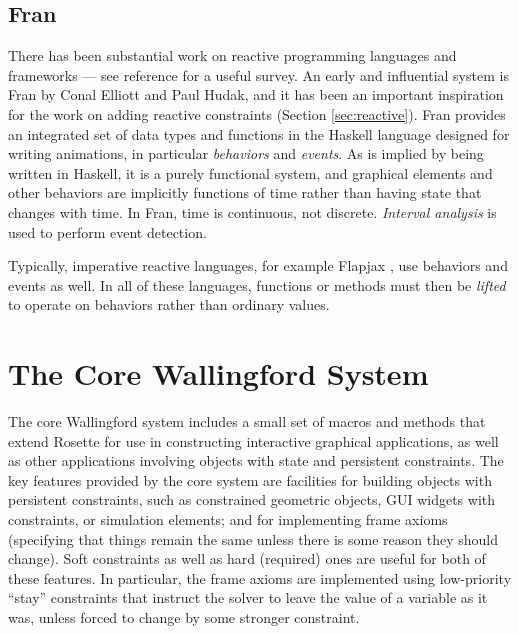 \documentclass{sigplanconf}
\begin{document}
\subsection{Fran}
\label{sec:fran}

There has been substantial work on reactive programming languages and
frameworks --- see reference
\cite{bainomugisha-computing-surveys-2012} for a useful survey.  An
early and influential system is Fran by Conal Elliott and Paul Hudak,
and it has been an important inspiration for the work on adding
reactive constraints (Section \ref{sec:reactive}).  Fran provides an
integrated set of data types and functions in the Haskell language
designed for writing animations, in particular \emph{behaviors} and
\emph{events}.  As is implied by being written in Haskell, it is a
purely functional system, and graphical elements and other behaviors
are implicitly functions of time rather than having state that changes
with time.  In Fran, time is continuous, not discrete.  \emph{Interval
  analysis} \cite{snyder-siggraph-1992} is used to perform event
detection.

Typically, imperative reactive languages, for example Flapjax
\cite{meyerovich-oopsla-2009}, use behaviors and events as well.  In
all of these languages, functions or methods must then be
\emph{lifted} to operate on behaviors rather than ordinary values.

\section{The Core Wallingford System}
\label{sec:core-wallingford}

The core Wallingford system includes a small set of macros and methods
that extend Rosette for use in constructing interactive graphical
applications, as well as other applications involving objects with
state and persistent constraints.  The key features provided by the
core system are facilities for building objects with persistent
constraints, such as constrained geometric objects, GUI widgets with
constraints, or simulation elements; and for implementing frame axioms
(specifying that things remain the same unless there is some reason
they should change).  Soft constraints as well as hard (required) ones
are useful for both of these features.  In particular, the frame
axioms are implemented using low-priority ``stay'' constraints that
instruct the solver to leave the value of a variable as it was, unless
forced to change by some stronger constraint.
\end{document}

